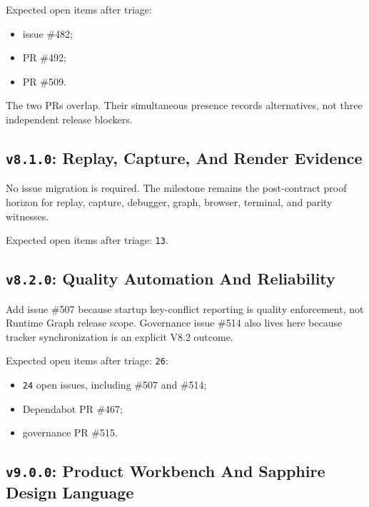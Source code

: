 Expected open items after triage:

\begin{itemize}
\tightlist
\item
  issue \#482;
\item
  PR \#492;
\item
  PR \#509.
\end{itemize}

The two PRs overlap. Their simultaneous presence records alternatives, not three independent release blockers.

\subsection{\texorpdfstring{\texttt{v\allowbreak{}8\allowbreak{}.\allowbreak{}1\allowbreak{}.\allowbreak{}0}: Replay, Capture, And Render Evidence}{: Replay, Capture, And Render Evidence}}\label{record-249-v8.1.0-replay-capture-and-render-evidence}

No issue migration is required. The milestone remains the post-contract proof horizon for replay, capture, debugger, graph, browser, terminal, and parity witnesses.

Expected open items after triage: \texttt{1\allowbreak{}3}.

\subsection{\texorpdfstring{\texttt{v\allowbreak{}8\allowbreak{}.\allowbreak{}2\allowbreak{}.\allowbreak{}0}: Quality Automation And Reliability}{: Quality Automation And Reliability}}\label{record-249-v8.2.0-quality-automation-and-reliability}

Add issue \#507 because startup key-conflict reporting is quality enforcement, not Runtime Graph release scope. Governance issue \#514 also lives here because tracker synchronization is an explicit V8.2 outcome.

Expected open items after triage: \texttt{2\allowbreak{}6}:

\begin{itemize}
\tightlist
\item
  \texttt{2\allowbreak{}4} open issues, including \#507 and \#514;
\item
  Dependabot PR \#467;
\item
  governance PR \#515.
\end{itemize}

\subsection{\texorpdfstring{\texttt{v\allowbreak{}9\allowbreak{}.\allowbreak{}0\allowbreak{}.\allowbreak{}0}: Product Workbench And Sapphire Design Language}{: Product Workbench And Sapphire Design Language}}\label{record-249-v9.0.0-product-workbench-and-sapphire-design-language}

